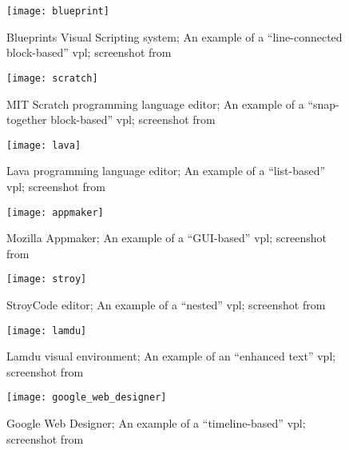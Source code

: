 \begin{figure}[h!]
    \centering \texttt{[image: blueprint]}
    \caption{
        Blueprints Visual Scripting system;
        An example of a ``line-connected block-based'' \acrshort{vpl};
        screenshot from \protect\cite{fig_blueprint}
    }
    \label{fig:blueprint}
\end{figure}

\begin{figure}[h!]
    \centering \texttt{[image: scratch]}
    \caption{
        MIT Scratch programming language editor;
        An example of a ``snap-together block-based'' \acrshort{vpl};
        screenshot from \protect\cite{fig_scratch}
    }
    \label{fig:scratch}
\end{figure}

\begin{figure}[h!]
    \centering \texttt{[image: lava]}
    \caption{
        Lava programming language editor;
        An example of a ``list-based'' \acrshort{vpl};
        screenshot from \protect\cite{fig_lava}
    }
    \label{fig:lava}
\end{figure}

\begin{figure}[h!]
    \centering \texttt{[image: appmaker]}
    \caption{
        Mozilla Appmaker;
        An example of a ``GUI-based'' \acrshort{vpl};
        screenshot from \protect\cite{fig_appmaker}
    }
    \label{fig:appmaker}
\end{figure}

\begin{figure}[h!]
    \centering \texttt{[image: stroy]}
    \caption{
        StroyCode editor;
        An example of a ``nested'' \acrshort{vpl};
        screenshot from \protect\cite{fig_stroy}
    }
    \label{fig:stroy}
\end{figure}

\begin{figure}[h!]
    \centering \texttt{[image: lamdu]}
    \caption{
        Lamdu visual environment;
        An example of an ``enhanced text'' \acrshort{vpl};
        screenshot from \protect\cite{fig_lamdu}
    }
    \label{fig:lamdu}
\end{figure}

\begin{figure}[h!]
    \centering \texttt{[image: google\_web\_designer]}
    \caption{
        Google Web Designer;
        An example of a ``timeline-based'' \acrshort{vpl};
        screenshot from \protect\cite{fig_google_web_designer}
    }
    \label{fig:google_web_designer}
\end{figure}

